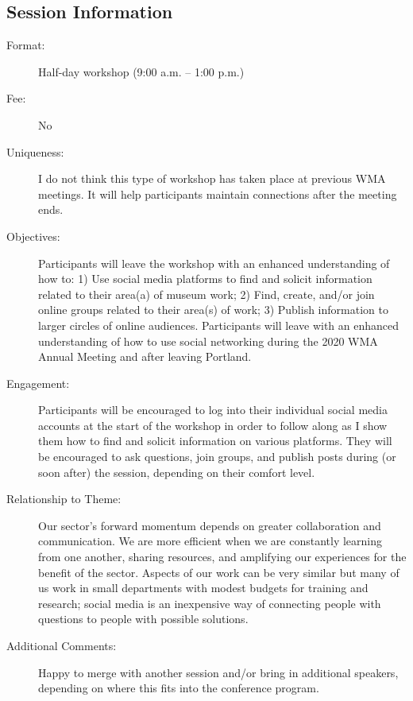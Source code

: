 \documentclass{report}
\begin{document}
              \subsection*{Session Information}
                \begin{description}
                  \item [Format:] Half-day workshop (9:00 a.m. – 1:00 p.m.)
							    
								  \item [Fee:]No
							     
							    \item [Uniqueness:]I do not think this type of workshop has taken place at previous WMA meetings. It will help participants maintain connections after the meeting ends.
							    \item [Objectives:]Participants will leave the workshop with an enhanced understanding of how to: 1) Use social media platforms to find and solicit information related to their area(a) of museum work; 2) Find, create, and/or join online groups related to their area(s) of work; 3) Publish information to larger circles of online audiences.  Participants will leave with an enhanced understanding of how to use social networking during the 2020 WMA Annual Meeting and after leaving Portland.
							    \item [Engagement:]Participants will be encouraged to log into their individual social media accounts at the start of the workshop in order to follow along as I show them how to find and solicit information on various platforms. They will be encouraged to ask questions, join groups, and publish posts during (or soon after) the session, depending on their comfort level.
							    \item [Relationship to Theme:]Our sector’s forward momentum depends on greater collaboration and communication. We are more efficient when we are constantly learning from one another, sharing resources, and amplifying our experiences for the benefit of the sector. Aspects of our work can be very similar but many of us work in small departments with modest budgets for training and research; social media is an inexpensive way of connecting people with questions to people with possible solutions.
							    
                    \item [Additional Comments: ]Happy to merge with another session and/or bring in additional speakers, depending on where this fits into the conference program.

                \end{description}
\end{document}

